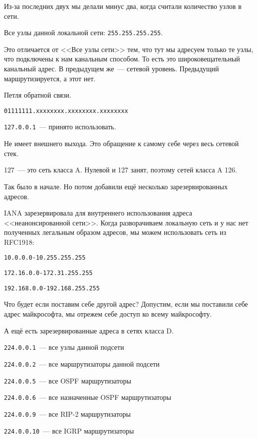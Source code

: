 Из-за последних двух мы делали минус два, когда считали количество узлов в сети.

\begin{MyItemize}
    \item Все узлы данной локальной сети: {\tt 255.255.255.255}.

    Это отличается от <<Все узлы сети>> тем, что тут мы адресуем только те узлы, что подключены к нам канальным способом. То есть это широковещательный канальный адрес. В предыдущем же~--- сетевой уровень. Предыдущий маршрутизируется, а этот нет.

    \item Петля обратной связи.

    {\tt 01111111.xxxxxxxx.xxxxxxxx.xxxxxxxx}

    {\tt 127.0.0.1}~--- принято использовать.

    Не имеет внешнего выхода. Это обращение к самому себе через весь сетевой стек. 

    127~--- это сеть класса A. Нулевой и 127 занят, поэтому сетей класса A 126.
\end{MyItemize}

Так было в начале. Но потом добавили ещё несколько зарезервированных адресов.

IANA зарезервировала для внутреннего использования адреса <<неанонсированной сети>>. Когда разворачиваем локальную сеть и у нас нет полученных легальным образом адресов, мы можем использовать сеть из RFC1918:

\begin{MyItemize}
    \item {\tt 10.0.0.0-10.255.255.255}
    \item {\tt 172.16.0.0-172.31.255.255}
    \item {\tt 192.168.0.0-192.168.255.255}
\end{MyItemize}

Что будет если поставим себе другой адрес? Допустим, если мы поставили себе адрес майкрософта, мы отрежем себе доступ ко всему майкрософту.

А ещё есть зарезервированные адреса в сетях класса D.

\begin{MyItemize}
    \item {\tt 224.0.0.1}~--- все узлы данной подсети
    \item {\tt 224.0.0.2}~--- все маршрутизаторы данной подсети
    \item {\tt 224.0.0.5}~--- все OSPF маршрутизаторы
    \item {\tt 224.0.0.6}~--- все назначенные OSPF маршрутизаторы
    \item {\tt 224.0.0.9}~--- все RIP-2 маршрутизаторы
    \item {\tt 224.0.0.10}~--- все IGRP маршрутизаторы
\end{MyItemize}


